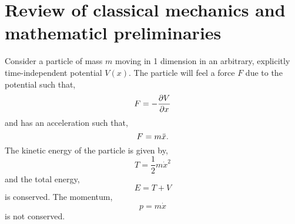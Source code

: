 \documentclass{book}
\begin{document}
\section{Review of classical mechanics and mathematicl preliminaries}
Consider a particle of mass $m$ moving in 1 dimension in an arbitrary, explicitly time-independent potential $V(x)$. The particle will feel a force $F$ due to the potential such that,
\begin{equation}
	F = -\pdv{V}{x}
\end{equation}
and has an acceleration such that,
\begin{equation}
	F = m\Ddot{x}.
\end{equation}
The kinetic energy of the particle is given by,
\begin{equation}
	T = \frac{1}{2}m\Dot{x}^2
\end{equation}
and the total energy,
\begin{equation}
	E = T + V
\end{equation}
is conserved. The momentum,
\begin{equation}
	p = m\Dot{x}
\end{equation}
is not conserved.
\end{document}

